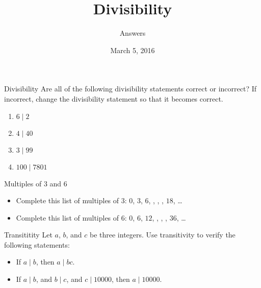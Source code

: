 \documentclass[12pt,letterpaper]{article}
\title{Divisibility}
\author{Answers}
\date{March 5, 2016}
\begin{document}
\maketitle

\thispagestyle{empty}

\begin{problem}{Divisibility}
 Are all of the following divisibility statements correct or incorrect? If
 incorrect, change the divisibility statement so that it becomes correct.

 \begin{enumerate}
  \item $6 \mid 2$  
  \item $4 \mid 40$ 
  \item $3 \mid 99$ 
  \item $100 \mid 7801$ 
 \end{enumerate}
\end{problem}

\begin{problem}{Multiples of $3$ and $6$}

 \begin{itemize}
  \item Complete this list of multiples of $3$: $0$, $3$, $6$, ,
  , , $18$, \ldots

  \item Complete this list of multiples of $6$: $0$, $6$, $12$, ,
  , , $36$, \ldots
 \end{itemize}
\end{problem}

\begin{problem}{Transititity}
 Let $a$, $b$, and $c$ be three integers. Use transitivity to verify the
 following statements:
 \begin{itemize}
  \item If $a \mid b$, then $a \mid bc$.
  \item If $a \mid b$, and $b \mid c$, and $c \mid 10000$, then $a \mid 10000$.
 \end{itemize}
\end{problem}
\end{document}
